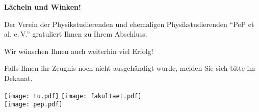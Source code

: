 \documentclass[parskip=half, fontsize=11pt]{scrartcl}
\begin{document}

\centering
\textbf{\fontsize{36}{40}\selectfont Lächeln und Winken!}

\vspace{1.0cm}

{\Large%
  Der Verein der Physikstudierenden und ehemaligen Physikstudierenden
  \enquote{PeP et al. e.\,V.} gratuliert Ihnen zu Ihrem Abschluss.

  Wir wünschen Ihnen auch weiterhin viel Erfolg!
}

\vfill

{
  \fontsize{140}{160}\selectfont\color{yellow!85!red}
}


\vfill
{\large%
  Falls Ihnen ihr Zeugnis noch nicht ausgehändigt wurde,
  melden Sie sich bitte im Dekanat.
}


\vspace{0.5cm}

\texttt{[image: tu.pdf]}%
\hfill%
\texttt{[image: fakultaet.pdf]}\\[0.5cm]
\texttt{[image: pep.pdf]}
  
\end{document}
